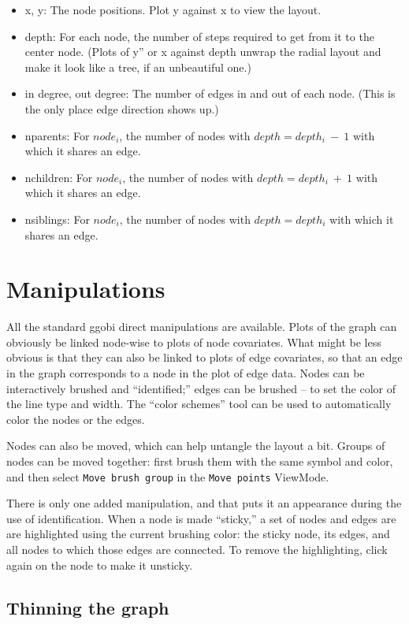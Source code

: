 \documentclass[11pt]{article}
\begin{document}
\begin{itemize}
\item x, y: The node positions.  Plot y against x to view the layout.
\item depth: For each node, the number of steps required to get from it
  to the center node. (Plots of y'' or x against depth unwrap the
  radial layout and make it look like a tree, if an unbeautiful one.)
\item in degree, out degree:  The number of edges in and out of each
  node. (This is the only place edge direction shows up.)
\item nparents: For $node_i$, the number of nodes with $depth = depth_i~-~1$
  with which it shares an edge. 
\item nchildren: For $node_i$, the number of nodes with $depth = depth_i~+~1$
  with which it shares an edge.
\item nsiblings: For $node_i$, the number of nodes with $depth = depth_i$
  with which it shares an edge.
\end{itemize}

\section{Manipulations}

All the standard ggobi direct manipulations are available.  Plots of
the graph can obviously be linked node-wise to plots of node covariates.
What might be less obvious is that they can also be linked to plots of
edge covariates, so that an edge in the graph corresponds to a node in the
plot of edge data.  Nodes can be interactively brushed and ``identified;''
edges can be brushed -- to set the color of the line type and width.
The ``color schemes'' tool can be used to automatically color the nodes
or the edges.

Nodes can also be moved, which can help untangle the layout a bit.
Groups of nodes can be moved together: first brush them with
the same symbol and color, and then select {\tt Move brush group}
in the {\tt Move points} ViewMode.

There is only one added manipulation, and that puts it an appearance
during the use of identification.  When a node is made ``sticky,'' a
set of nodes and edges are are highlighted using the current brushing
color:  the sticky node, its edges, and all nodes to which those edges
are connected.  To remove the highlighting, click again on the node to
make it unsticky.

\subsection{Thinning the graph}
\end{document}
